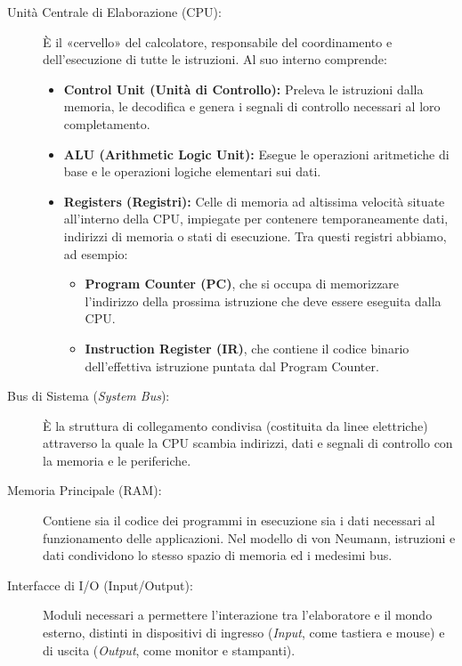 \documentclass[12pt]{report}
\begin{document}
	\begin{description}
		\item [Unità Centrale di Elaborazione (CPU):] È il «cervello» del calcolatore, responsabile del coordinamento e dell'esecuzione di tutte le istruzioni. Al suo interno comprende:
		\begin{itemize}
			\item \textbf{Control Unit (Unità di Controllo):} Preleva le istruzioni dalla memoria, le decodifica e genera i segnali di controllo necessari al loro completamento.
			\item \textbf{ALU (Arithmetic Logic Unit):} Esegue le operazioni aritmetiche di base e le operazioni logiche elementari sui dati.
			\item \textbf{Registers (Registri):} Celle di memoria ad altissima velocità situate all'interno della CPU, impiegate per contenere temporaneamente dati, indirizzi di memoria o stati di esecuzione. Tra questi registri abbiamo, ad esempio:
			\begin{itemize}
				\item \textbf{Program Counter (PC)}, che si occupa di memorizzare l'indirizzo della prossima istruzione che deve essere eseguita dalla CPU.
				\item \textbf{Instruction Register (IR)}, che contiene il codice binario dell'effettiva istruzione puntata dal Program Counter.
			\end{itemize}
		\end{itemize}
		
		\item [Bus di Sistema (\textit{System Bus}):] È la struttura di collegamento condivisa (costituita da linee elettriche) attraverso la quale la CPU scambia indirizzi, dati e segnali di controllo con la memoria e le periferiche.
		
		\item [Memoria Principale (RAM):] Contiene sia il codice dei programmi in esecuzione sia i dati necessari al funzionamento delle applicazioni. Nel modello di von Neumann, istruzioni e dati condividono lo stesso spazio di memoria ed i medesimi bus.
		
		\item [Interfacce di I/O (Input/Output):] Moduli necessari a permettere l'interazione tra l'elaboratore e il mondo esterno, distinti in dispositivi di ingresso (\textit{Input}, come tastiera e mouse) e di uscita (\textit{Output}, come monitor e stampanti).
	\end{description}
	
\end{document}
